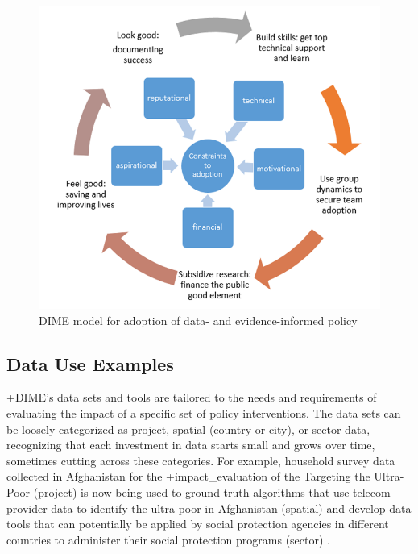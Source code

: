 \documentclass[
]{book}
\begin{document}
\begin{figure}
\includegraphics[width=1\linewidth]{./assets/dime/dimefigure2web} \caption{DIME model for adoption of data- and evidence-informed policy}\label{fig:dimefigure2}
\end{figure}

\hypertarget{data-use-examples-7}{%
\subsection{Data Use Examples}\label{data-use-examples-7}}

+DIME\textbar's data sets and tools are tailored to the needs and requirements of evaluating the impact of a specific set of policy interventions. The data sets can be loosely categorized as project, spatial (country or city), or sector data, recognizing that each investment in data starts small and grows over time, sometimes cutting across these categories. For example, household survey data collected in Afghanistan for the +impact\_evaluation\textbar{} of the Targeting the Ultra-Poor (project) is now being used to ground truth algorithms that use telecom-provider data to identify the ultra-poor in Afghanistan (spatial) and develop data tools that can potentially be applied by social protection agencies in different countries to administer their social protection programs (sector) \citep[see][]{aiken2020}.
\end{document}
